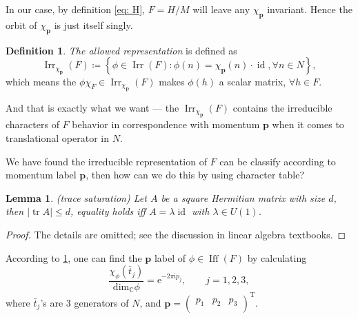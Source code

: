 \documentclass[11pt, reqno]{amsart}
\newtheorem{lemma}[theorem]{Lemma}
\theoremstyle{definition}
\newtheorem{definition}[theorem]{Definition}
\theoremstyle{remark}
\begin{document}
In our case, by definition \eqref{eq: H}, $F=H/M$ will leave any $\chi_{\mathbf{p}}$ invariant. Hence the orbit of $\chi_{\mathbf{p}}$ is just itself singly.

\begin{definition}
    \textit{The allowed representation} is defined as
    \begin{equation}
        \operatorname{Irr}_{\chi _{\mathbf{p}}}\left( F \right) \coloneqq \left\{ \phi \in \operatorname{Irr}\left( F \right) :\phi \left( n \right) =\chi _{\mathbf{p}}\left( n \right) \cdot \operatorname{id},\forall n\in N \right\} ,
    \end{equation}
    which means the $\phi \chi_F\in \operatorname{Irr}_{\chi _{\mathbf{p}}}\left( F \right)$ makes $\phi(h)$ a scalar matrix, $\forall h\in F$.
\end{definition}


And that is exactly what we want --- the $\operatorname{Irr}_{\chi_\mathbf{p}}\left(F\right)$ contains the irreducible characters of $F$ behavior in correspondence with momentum $\mathbf{p}$ when it comes to translational operator in $N$.


We have found the irreducible representation of $F$ can be classify according to momentum label $\mathbf{p}$, then how can we do this by using character table?

\begin{lemma}\label{lem: trace saturation}
    (trace saturation) Let $A$ be a square Hermitian matrix with size $d$, then $\left| \operatorname{tr}A \right|\le d$, equality holds iff $A=\lambda\operatorname{id}$ with $\lambda\in U(1)$.
\end{lemma}
\begin{proof}
    The details are omitted; see the discussion in linear algebra textbooks.
\end{proof}

According to \ref{lem: trace saturation}, one can find the $\mathbf{p}$ label of $\phi\in\operatorname{Iff}\left(F\right)$ by calculating
\begin{equation}
    \frac{\chi _{\phi}\left( \bar{t}_j \right)}{\mathrm{dim}_{\mathbb{C}}\phi}=\mathrm{e}^{-2\pi \mathrm{i}p_j},\qquad j=1,2,3,
\end{equation}
where $\bar{t}_j$'s are 3 generators of $N$, and $\mathbf{p}=\left( \begin{matrix}
	p_1&		p_2&		p_3\\
\end{matrix} \right) ^{\mathrm{T}}$.







\nocite{*}


\end{document}
